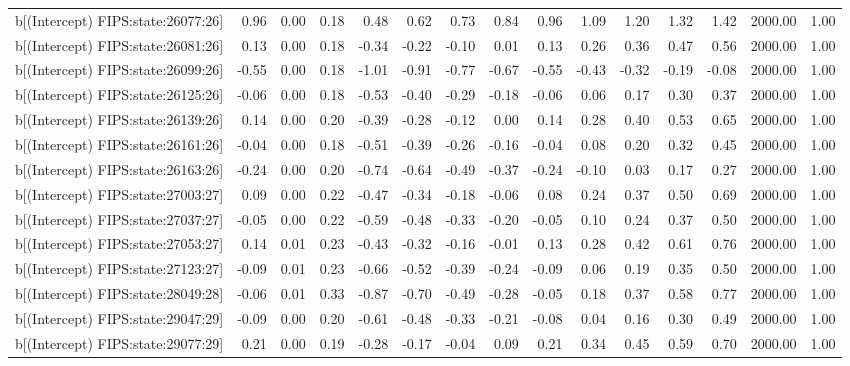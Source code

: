 \begin{table}[ht]
\begin{tabular}{rrrrrrrrrrrrrrr}
  b[(Intercept) FIPS:state:26077:26] & 0.96 & 0.00 & 0.18 & 0.48 & 0.62 & 0.73 & 0.84 & 0.96 & 1.09 & 1.20 & 1.32 & 1.42 & 2000.00 & 1.00 \\ 
  b[(Intercept) FIPS:state:26081:26] & 0.13 & 0.00 & 0.18 & -0.34 & -0.22 & -0.10 & 0.01 & 0.13 & 0.26 & 0.36 & 0.47 & 0.56 & 2000.00 & 1.00 \\ 
  b[(Intercept) FIPS:state:26099:26] & -0.55 & 0.00 & 0.18 & -1.01 & -0.91 & -0.77 & -0.67 & -0.55 & -0.43 & -0.32 & -0.19 & -0.08 & 2000.00 & 1.00 \\ 
  b[(Intercept) FIPS:state:26125:26] & -0.06 & 0.00 & 0.18 & -0.53 & -0.40 & -0.29 & -0.18 & -0.06 & 0.06 & 0.17 & 0.30 & 0.37 & 2000.00 & 1.00 \\ 
  b[(Intercept) FIPS:state:26139:26] & 0.14 & 0.00 & 0.20 & -0.39 & -0.28 & -0.12 & 0.00 & 0.14 & 0.28 & 0.40 & 0.53 & 0.65 & 2000.00 & 1.00 \\ 
  b[(Intercept) FIPS:state:26161:26] & -0.04 & 0.00 & 0.18 & -0.51 & -0.39 & -0.26 & -0.16 & -0.04 & 0.08 & 0.20 & 0.32 & 0.45 & 2000.00 & 1.00 \\ 
  b[(Intercept) FIPS:state:26163:26] & -0.24 & 0.00 & 0.20 & -0.74 & -0.64 & -0.49 & -0.37 & -0.24 & -0.10 & 0.03 & 0.17 & 0.27 & 2000.00 & 1.00 \\ 
  b[(Intercept) FIPS:state:27003:27] & 0.09 & 0.00 & 0.22 & -0.47 & -0.34 & -0.18 & -0.06 & 0.08 & 0.24 & 0.37 & 0.50 & 0.69 & 2000.00 & 1.00 \\ 
  b[(Intercept) FIPS:state:27037:27] & -0.05 & 0.00 & 0.22 & -0.59 & -0.48 & -0.33 & -0.20 & -0.05 & 0.10 & 0.24 & 0.37 & 0.50 & 2000.00 & 1.00 \\ 
  b[(Intercept) FIPS:state:27053:27] & 0.14 & 0.01 & 0.23 & -0.43 & -0.32 & -0.16 & -0.01 & 0.13 & 0.28 & 0.42 & 0.61 & 0.76 & 2000.00 & 1.00 \\ 
  b[(Intercept) FIPS:state:27123:27] & -0.09 & 0.01 & 0.23 & -0.66 & -0.52 & -0.39 & -0.24 & -0.09 & 0.06 & 0.19 & 0.35 & 0.50 & 2000.00 & 1.00 \\ 
  b[(Intercept) FIPS:state:28049:28] & -0.06 & 0.01 & 0.33 & -0.87 & -0.70 & -0.49 & -0.28 & -0.05 & 0.18 & 0.37 & 0.58 & 0.77 & 2000.00 & 1.00 \\ 
  b[(Intercept) FIPS:state:29047:29] & -0.09 & 0.00 & 0.20 & -0.61 & -0.48 & -0.33 & -0.21 & -0.08 & 0.04 & 0.16 & 0.30 & 0.49 & 2000.00 & 1.00 \\ 
  b[(Intercept) FIPS:state:29077:29] & 0.21 & 0.00 & 0.19 & -0.28 & -0.17 & -0.04 & 0.09 & 0.21 & 0.34 & 0.45 & 0.59 & 0.70 & 2000.00 & 1.00 \\ 

\end{tabular}
\end{table}

